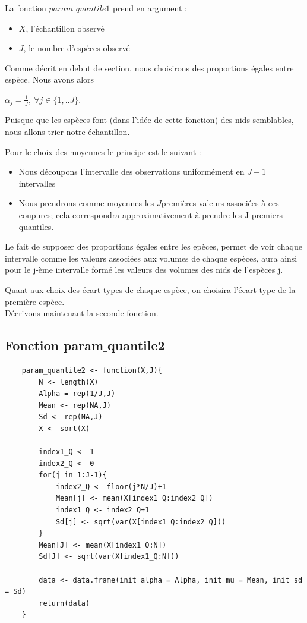 \documentclass[frenchb]{report}
\newcommand{\1}{\mathbbm{1}}
\theoremstyle{definition}\newtheorem{defn}{Définition}
\theoremstyle{definition}\newtheorem{exm}{Exemple}
\theoremstyle{definition}\newtheorem{nota}{Notation}
\theoremstyle{definition}\newtheorem{rem}{Remarque}
\begin{document}
La fonction $param\_quantile1$ prend en argument : 
\begin{itemize}
	\item $X$, l'échantillon observé
	\item $J$, le nombre d'espèces observé
\end{itemize}


Comme décrit en debut de section, nous choisirons des proportions égales entre espèce. Nous avons alors 
\begin{center}
$\alpha_j = \frac{1}{J},~\forall j \in \{1,..J\}$.
\end{center}
Puisque que les espèces font (dans l'idée de cette fonction) des nids semblables, nous allons trier notre échantillon. 

Pour le choix des moyennes le principe est le suivant : 
\begin{itemize}
\item Nous découpons l'intervalle des observations uniformément en $J+1$ intervalles
\item Nous prendrons comme moyennes les $J$premières valeurs associées à ces coupures; cela correspondra approximativement à prendre les J premiers quantiles.
\end{itemize}
Le fait de supposer des proportions égales entre les epèces, permet de voir chaque intervalle comme les valeurs associées aux volumes de chaque espèces, aura ainsi pour le j-ème intervalle formé les valeurs des volumes des nids de l'espèces j.

Quant aux choix des écart-types de chaque espèce, on choisira l'écart-type de la première espèce. \\

Décrivons maintenant la seconde fonction.

\subsection{Fonction param$\_$quantile2}

\begin{lstlisting}
	param_quantile2 <- function(X,J){
		N <- length(X)
		Alpha = rep(1/J,J)
		Mean <- rep(NA,J)
		Sd <- rep(NA,J)
		X <- sort(X)

		index1_Q <- 1
		index2_Q <- 0
		for(j in 1:J-1){
			index2_Q <- floor(j*N/J)+1
			Mean[j] <- mean(X[index1_Q:index2_Q])
			index1_Q <- index2_Q+1
			Sd[j] <- sqrt(var(X[index1_Q:index2_Q]))
		}
		Mean[J] <- mean(X[index1_Q:N])
		Sd[J] <- sqrt(var(X[index1_Q:N]))
  
		data <- data.frame(init_alpha = Alpha, init_mu = Mean, init_sd = Sd)
		return(data)
	}
\end{lstlisting}
\end{document}

